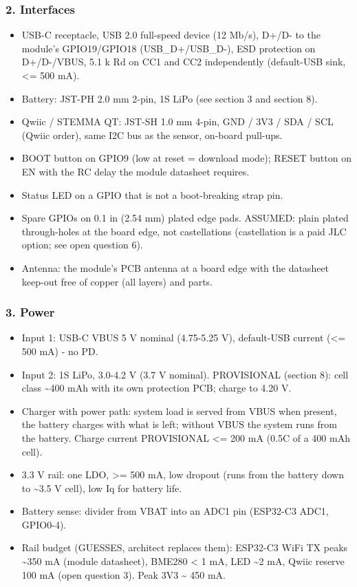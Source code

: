 \documentclass[11pt]{article}
\begin{document}
\subsubsection*{2. Interfaces}
\begin{itemize}
\item USB-C receptacle, USB 2.0 full-speed device (12 Mb/s), D+/D- to the module's
GPIO19/GPIO18 (USB\_D+/USB\_D-), ESD protection on D+/D-/VBUS, 5.1 k Rd on CC1
and CC2 independently (default-USB sink, \textless{}= 500 mA).
\item Battery: JST-PH 2.0 mm 2-pin, 1S LiPo (see section 3 and section 8).
\item Qwiic / STEMMA QT: JST-SH 1.0 mm 4-pin, GND / 3V3 / SDA / SCL (Qwiic order),
same I2C bus as the sensor, on-board pull-ups.
\item BOOT button on GPIO9 (low at reset = download mode); RESET button on EN with
the RC delay the module datasheet requires.
\item Status LED on a GPIO that is not a boot-breaking strap pin.
\item Spare GPIOs on 0.1 in (2.54 mm) plated edge pads. ASSUMED: plain plated
through-holes at the board edge, not castellations (castellation is a paid
JLC option; see open question 6).
\item Antenna: the module's PCB antenna at a board edge with the datasheet keep-out
free of copper (all layers) and parts.
\end{itemize}
\subsubsection*{3. Power}
\begin{itemize}
\item Input 1: USB-C VBUS 5 V nominal (4.75-5.25 V), default-USB current
(\textless{}= 500 mA) - no PD.
\item Input 2: 1S LiPo, 3.0-4.2 V (3.7 V nominal). PROVISIONAL (section 8): cell
class \textasciitilde{}400 mAh with its own protection PCB; charge to 4.20 V.
\item Charger with power path: system load is served from VBUS when present, the
battery charges with what is left; without VBUS the system runs from the
battery. Charge current PROVISIONAL \textless{}= 200 mA (0.5C of a 400 mAh cell).
\item 3.3 V rail: one LDO, \textgreater{}= 500 mA, low dropout (runs from the battery down to
\textasciitilde{}3.5 V cell), low Iq for battery life.
\item Battery sense: divider from VBAT into an ADC1 pin (ESP32-C3 ADC1, GPIO0-4).
\item Rail budget (GUESSES, architect replaces them): ESP32-C3 WiFi TX peaks
\textasciitilde{}350 mA (module datasheet), BME280 \textless{} 1 mA, LED \textasciitilde{}2 mA, Qwiic reserve 100 mA
(open question 3). Peak 3V3 \textasciitilde{} 450 mA.
\end{itemize}
\end{document}
